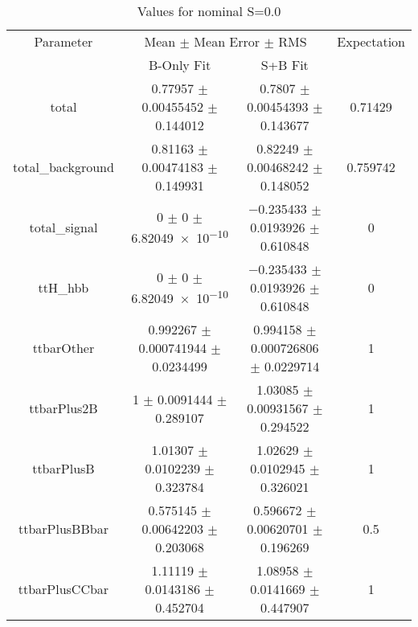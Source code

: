 \begin{table}
\centering
\caption{Values for nominal S=0.0}
\begin{tabular}{cccc}
\toprule
Parameter & \multicolumn{2}{c}{Mean $\pm$ Mean Error $\pm$ RMS} & Expectation\\
 & B-Only Fit & S+B Fit & \\
\midrule
total & \num{0.77957} $\pm$ \num{0.00455452} $\pm$ \num{0.144012} & \num{0.7807} $\pm$ \num{0.00454393} $\pm$ \num{0.143677} & \num{0.71429}\\
total\_background & \num{0.81163} $\pm$ \num{0.00474183} $\pm$ \num{0.149931} & \num{0.82249} $\pm$ \num{0.00468242} $\pm$ \num{0.148052} & \num{0.759742}\\
total\_signal & \num{0} $\pm$ \num{0} $\pm$ \num{6.82049e-10} & \num{-0.235433} $\pm$ \num{0.0193926} $\pm$ \num{0.610848} & \num{0}\\
ttH\_hbb & \num{0} $\pm$ \num{0} $\pm$ \num{6.82049e-10} & \num{-0.235433} $\pm$ \num{0.0193926} $\pm$ \num{0.610848} & \num{0}\\
ttbarOther & \num{0.992267} $\pm$ \num{0.000741944} $\pm$ \num{0.0234499} & \num{0.994158} $\pm$ \num{0.000726806} $\pm$ \num{0.0229714} & \num{1}\\
ttbarPlus2B & \num{1} $\pm$ \num{0.0091444} $\pm$ \num{0.289107} & \num{1.03085} $\pm$ \num{0.00931567} $\pm$ \num{0.294522} & \num{1}\\
ttbarPlusB & \num{1.01307} $\pm$ \num{0.0102239} $\pm$ \num{0.323784} & \num{1.02629} $\pm$ \num{0.0102945} $\pm$ \num{0.326021} & \num{1}\\
ttbarPlusBBbar & \num{0.575145} $\pm$ \num{0.00642203} $\pm$ \num{0.203068} & \num{0.596672} $\pm$ \num{0.00620701} $\pm$ \num{0.196269} & \num{0.5}\\
ttbarPlusCCbar & \num{1.11119} $\pm$ \num{0.0143186} $\pm$ \num{0.452704} & \num{1.08958} $\pm$ \num{0.0141669} $\pm$ \num{0.447907} & \num{1}\\
\bottomrule
\end{tabular}
\end{table}